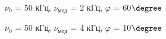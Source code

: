 \documentclass[a4paper,12pt]{article}
\theoremstyle{definition}
\begin{document}
\begin{enumerate}
\begin{figure}[h]
\begin{minipage}[h]{0.44\linewidth}
\end{minipage}
\vfill
\begin{minipage}[h]{0.44\linewidth}
 $\nu_0$ = 50 кГц, $\nu_\text{мод}$ = 2 кГц, $\varphi$ = 60$\degree$   \\
\end{minipage}
\hfill
\begin{minipage}[h]{0.44\linewidth}
 $\nu_0$ = 50 кГц, $\nu_\text{мод}$ = 4 кГц, $\varphi$ = 10$\degree$  \\
\end{minipage}
\vfill
\caption{}
\label{ris:experimentalcorrelationsignals}
\end{figure}





\end{enumerate}
\end{document}
